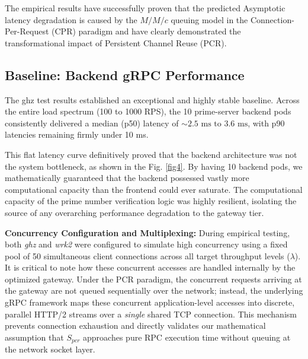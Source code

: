 \documentclass{ieeeaccess}
\begin{document}
The empirical results have successfully proven that the predicted Asymptotic latency degradation is caused by the $M/M/c$ queuing model in the Connection-Per-Request (CPR) paradigm and have clearly demonstrated the transformational impact of Persistent Channel Reuse (PCR). 

\subsection{Baseline: Backend gRPC Performance}
\label{sec5.1}



The ghz test results established an exceptional and highly stable baseline. Across the entire load spectrum (100 to 1000 RPS), the 10 prime-server backend pods consistently delivered a median (p50) latency of $\sim 2.5 \text{ ms} \text{ to } 3.6 \text{ ms}$, with p90 latencies remaining firmly under 10 ms. 

This flat latency curve definitively proved that the backend architecture was not the system bottleneck, as shown in the Fig. \ref{fig4}. By having 10 backend pods, we mathematically guaranteed that the backend possessed vastly more computational capacity than the frontend could ever saturate. The computational capacity of the prime number verification logic was highly resilient, isolating the source of any overarching performance degradation to the gateway tier.

\textbf{Concurrency Configuration and Multiplexing:}
During empirical testing, both \textit{ghz} and \textit{wrk2} were configured to simulate high concurrency using a fixed pool of 50 simultaneous client connections across all target throughput levels ($\lambda$). It is critical to note how these concurrent accesses are handled internally by the optimized gateway. Under the PCR paradigm, the concurrent requests arriving at the gateway are not queued sequentially over the network; instead, the underlying gRPC framework maps these concurrent application-level accesses into discrete, parallel HTTP/2 streams over a \textit{single} shared TCP connection. This mechanism prevents connection exhaustion and directly validates our mathematical assumption that $S_{pcr}$ approaches pure RPC execution time without queuing at the network socket layer.
\end{document}
